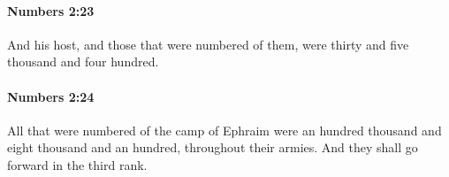 		\paragraph{Numbers 2:23} %
			\label{NUMBERS-2-23}

			And his host, and those that were numbered of them, were thirty and five thousand and four hundred.


		\paragraph{Numbers 2:24} %
			\label{NUMBERS-2-24}

			All that were numbered of the camp of Ephraim were an hundred thousand and eight thousand and an hundred, throughout their armies. And they shall go forward in the third rank.


